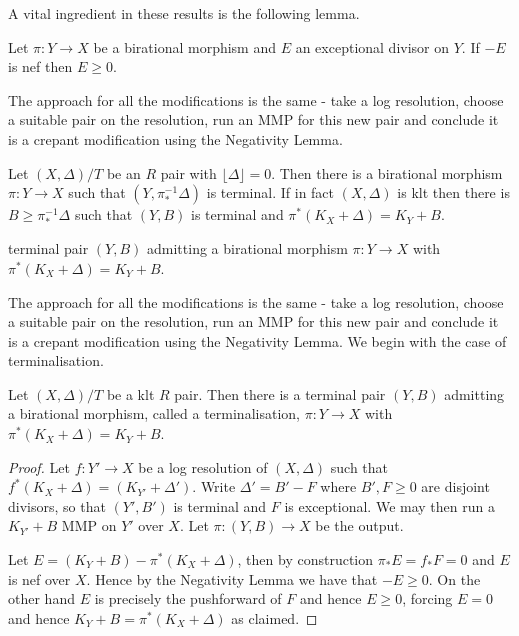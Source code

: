 \documentclass[a4paper,12pt]{book}
\begin{document}
A vital ingredient in these results is the following lemma.

\begin{lemma}\cite{}	
	Let $\pi:Y \to X$ be a birational morphism and $E$ an exceptional divisor on $Y$. If $-E$ is nef then $E \geq 0$.

	\end{lemma}
The approach for all the modifications is the same - take a log resolution, choose a suitable pair on the resolution, run an MMP for this new pair and conclude it is a crepant modification using the Negativity Lemma.
\begin{lemma}
	
	Let $(X,\Delta)/T$ be an $R$ pair with $\lfloor \Delta \rfloor =0$. Then there is a birational morphism $\pi:Y \to X$ such that $(Y,\pi_{*}^{-1}\Delta)$ is terminal. If in fact $(X,\Delta)$ is klt then there is $B \geq \pi_{*}^{-1}\Delta$ such that $(Y,B)$ is terminal and $\pi^{*}(K_{X}+\Delta)=K_{Y}+B$.
	
	
	terminal pair $(Y,B)$ admitting a birational morphism $\pi:Y \to X$ with $\pi^{*}(K_{X}+\Delta)=K_{Y}+B$.
	
\end{lemma}

The approach for all the modifications is the same - take a log resolution, choose a suitable pair on the resolution, run an MMP for this new pair and conclude it is a crepant modification using the Negativity Lemma. We begin with the case of terminalisation.


\begin{lemma}
	
	Let $(X,\Delta)/T$ be a klt $R$ pair. Then there is a terminal pair $(Y,B)$ admitting a birational morphism, called a terminalisation, $\pi:Y \to X$ with $\pi^{*}(K_{X}+\Delta)=K_{Y}+B$.
	
	\end{lemma}



\begin{proof}
	
	Let $f:Y' \to X$ be a log resolution of $(X,\Delta)$ such that $f^{*}(K_{X}+\Delta)=(K_{Y'}+\Delta')$. Write $\Delta'=B'-F$ where $B',F \geq 0$ are disjoint divisors, so that $(Y',B')$ is terminal and $F$ is exceptional. We may then run a $K_{Y'}+B$ MMP on $Y'$ over $X$. Let $\pi:(Y,B) \to X$ be the output. 
	
	Let $E=(K_{Y}+B)-\pi^{*}(K_{X}+\Delta)$, then by construction $\pi_{*}E=f_{*}F=0$ and $E$ is nef over $X$. Hence by the Negativity Lemma we have that $-E \geq 0$. On the other hand $E$ is precisely the pushforward of $F$ and hence $E \geq 0$, forcing $E=0$ and hence $K_{Y}+B=\pi^{*}(K_{X}+\Delta)$ as claimed.

\end{proof}
\end{document}
